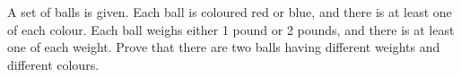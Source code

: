 A set of balls is given. Each ball is coloured red or blue, and there is at least one of each colour. Each ball weighs either 1 pound or 2 pounds, and there is at least one of each weight. Prove that there are two balls having different weights and different colours.